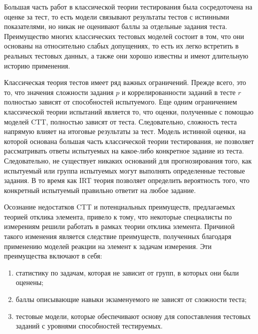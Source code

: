 \documentclass[14pt, a4paper]{extarticle}
\numberwithin{equation}{section}
\begin{document}
{Большая часть работ в классической теории тестирования была сосредоточена на оценке за тест, то есть модели связывают результаты тестов с истинными показателями, но никак не оценивают баллы за отдельные задания теста. Преимущество многих классических тестовых моделей состоит в том, что они основаны на относительно слабых допущениях, то есть их легко встретить в реальных тестовых данных, а также они хорошо известны и имеют длительную историю применения.

Классическая теория тестов имеет ряд важных ограничений. Прежде всего, это то, что значения сложности задания $p$ и коррелированности заданий в тесте $r$ полностью зависят от способностей испытуемого. Еще одним ограничением классической теории испытаний является то, что оценки, полученные с помощью моделей CTT, полностью зависят от теста. Следовательно, сложность теста напрямую влияет на итоговые результаты за тест. Модель истинной оценки, на которой основана большая часть классической теории тестирования, не позволяет рассматривать ответы испытуемых на какое-либо конкретное задание из теста. Следовательно, не существует никаких оснований для прогнозирования того, как испытуемый или группа испытуемых могут выполнять определенные тестовые задания. В то время как IRT теория позволяет определить вероятность того, что конкретный испытуемый правильно ответит на любое задание.


Осознание недостатков CTT и потенциальных преимуществ, предлагаемых теорией отклика элемента, привело к тому, что некоторые специалисты по измерениям решили работать в рамках теории отклика элемента. Причиной такого изменения является следствие преимуществ, полученных благодаря применению моделей реакции на элемент к задачам измерения. Эти преимущества включают в себя:
\begin{enumerate}
  \item статистику по задачам, которая не зависит от групп, в которых они были оценены;
  \item баллы описывающие навыки экзаменуемого не зависят от сложности теста;
  \item тестовые модели, которые обеспечивают основу для сопоставления тестовых заданий с уровнями способностей тестируемых.
\end{enumerate}

}
\end{document}
